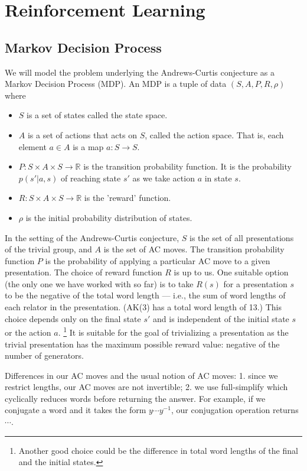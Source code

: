 
\section{Reinforcement Learning}

\subsection{Markov Decision Process}

We will model the problem underlying the Andrews-Curtis conjecture as a Markov Decision
Process (MDP). An MDP is a tuple of data $(S, A, P, R, \rho)$ where
\begin{itemize}
	\item $S$ is a set of states called the state space.
	\item $A$ is a set of actions that acts on $S$, called the action space.
	That is, each element $a \in A$ is a map $a: S \to S$.
	\item $P: S \times A \times S \to \mathbb{R}$ is the transition
	probability function. It is the probability $p (s' | a, s)$ of reaching
	state $s'$ as we take action $a$ in state $s$.
	\item $R: S \times A \times S \to \mathbb{R}$ is the 'reward' function.
	\item $\rho$ is the initial probability distribution of states.
\end{itemize}

In the setting of the Andrews-Curtis conjecture, $S$ is the set of all presentations of
the trivial group, and $A$ is the set of AC moves. The transition probability function $P$ is the probability
of applying a particular AC move to a given presentation.
The choice of reward function $R$ is up to us. One suitable option (the only one we have worked with so far)
is to take $R(s)$ for a presentation $s$ to be the negative of the total word length ---
i.e., the sum of word lengths of each relator in the presentation. (AK(3) has a total word length of 13.)
This choice depends only on the final state $s'$ and is independent of the initial state $s$
or the action $a$.
\footnote{Another good choice could be the difference in total word lengths
	of the final and the initial states.} It is suitable for the goal of trivializing a presentation
as the trivial presentation has the maximum possible reward value: negative of the number of generators.

Differences in our AC moves and the usual notion of AC moves: 1. since we restrict lengths, our AC moves are not invertible; 2. we use full-simplify which cyclically reduces words before returning the answer. For example, if we conjugate a word and it takes the form $y \cdots y^{-1}$, our conjugation operation returns $\cdots$.

